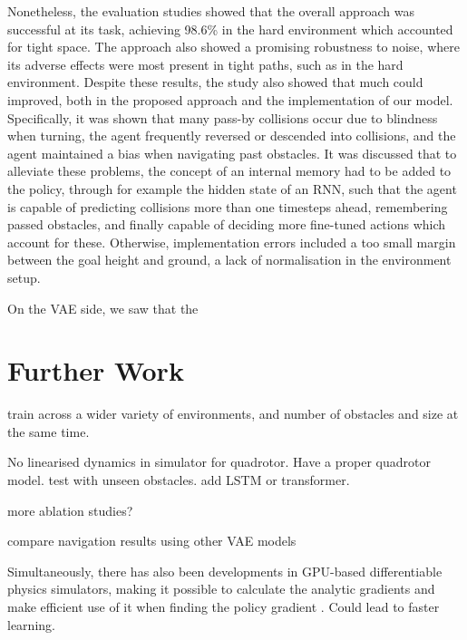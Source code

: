 Nonetheless, the evaluation studies showed that the overall approach was successful at its task, achieving 98.6\% in the hard environment which accounted for tight space. The approach also showed a promising robustness to noise, where its adverse effects were most present in tight paths, such as in the hard environment. Despite these results, the study also showed that much could improved, both in the proposed approach and the implementation of our model. Specifically, it was shown that many pass-by collisions occur due to blindness when turning, the agent frequently reversed or descended into collisions, and the agent maintained a bias when navigating past obstacles.
It was discussed that to alleviate these problems, the concept of an internal memory had to be added to the policy, through for example the hidden state of an RNN, such that the agent is capable of predicting collisions more than one timesteps ahead, remembering passed obstacles, and finally capable of deciding more fine-tuned actions which account for these. Otherwise, implementation errors included a too small margin between the goal height and ground, a lack of normalisation in the environment setup. 

On the VAE side, we saw that the 

\section{Further Work}
\label{sec:10_further_work}

train across a wider variety of environments, and number of obstacles and size at the same time.

No linearised dynamics in simulator for quadrotor. 
Have a proper quadrotor model. 
test with unseen obstacles.
add LSTM or transformer.

more ablation studies?

compare navigation results using other VAE models

Simultaneously, there has also been developments in GPU-based differentiable physics simulators, making it possible to calculate the analytic gradients and make efficient use of it when finding the policy gradient \cite{oldDifferentiablePhysicsSimulator, differentiablePhysicsSimulator}. Could lead to faster learning. 
